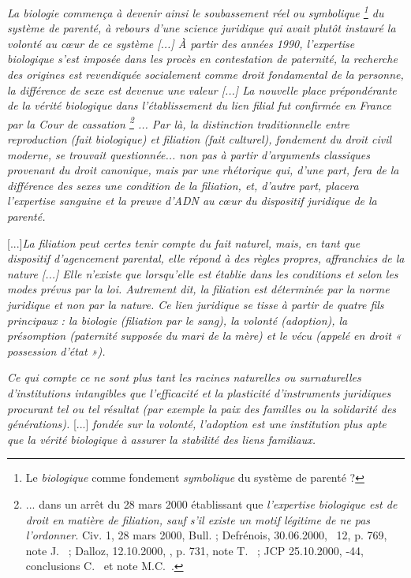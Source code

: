 \begin{displayquote}
{\emph{La biologie commença à devenir ainsi le soubassement réel ou symbolique%
\footnote{Le \emph{biologique} comme fondement \emph{symbolique} du système de parenté ?} 
du système de parenté, à rebours d'une science juridique qui avait plutôt instauré la volonté au cœur de ce système \emph{[...]} À partir des années 1990, l'expertise biologique s'est imposée dans les procès en contestation de paternité, la recherche des origines est revendiquée socialement comme droit fondamental de la personne, la différence de sexe est devenue une valeur \emph{[...]} La nouvelle place prépondérante de la vérité biologique dans l'établissement du lien filial fut confirmée en France par la Cour de cassation%
\footnote{... dans un arrêt du 28 mars 2000 établissant que {\emph{l'expertise biologique est de droit en matière de filiation, sauf s'il existe un motif légitime de ne pas l'ordonner}}. Civ. 1\iere, 28 mars 2000, Bull.  ; \hbox{Defrénois}, \hbox{30.06.2000}, \no~12, p. 769, note J.~ ; \hbox{Dalloz}, \hbox{12.10.2000}, , p. 731, note T.~ ; JCP \hbox{25.10.2000}, -44, conclusions C.~ et note M.C.~.}%
... Par là, la distinction traditionnelle entre reproduction (fait biologique) et filiation (fait culturel), fondement du droit civil moderne, se trouvait questionnée... non pas à partir d'arguments classiques provenant du droit canonique, mais par une rhétorique qui, d'une part, fera de la différence des sexes une condition  de la filiation, et, d'autre part, placera l'expertise sanguine et la preuve d'ADN au cœur du dispositif juridique de la parenté.}}
 


[...]\emph{La filiation peut certes tenir compte du fait naturel, mais, en tant que dispositif d'agencement parental, elle répond à des règles propres, affranchies de la nature \emph{[...]} Elle n'existe que lorsqu'elle est établie dans les conditions et selon les modes prévus par la loi. Autrement dit, la filiation est déterminée par la norme juridique et non par la nature. Ce lien juridique se tisse à partir de quatre fils principaux : la biologie (filiation par le sang), la volonté (adoption), la présomption (paternité supposée du mari de la mère) et le vécu (appelé en droit « possession d'état »).}


 
\emph{Ce qui compte ce ne sont plus tant les racines naturelles ou surnaturelles d'institutions intangibles que l'efficacité et la plasticité d'instruments juridiques procurant tel ou tel résultat (par exemple la paix des familles ou la solidarité des générations).}  [...] \emph{fondée sur la volonté, l'adoption est une institution plus apte que la vérité biologique à assurer la stabilité des liens familiaux.}
  \end{displayquote}

